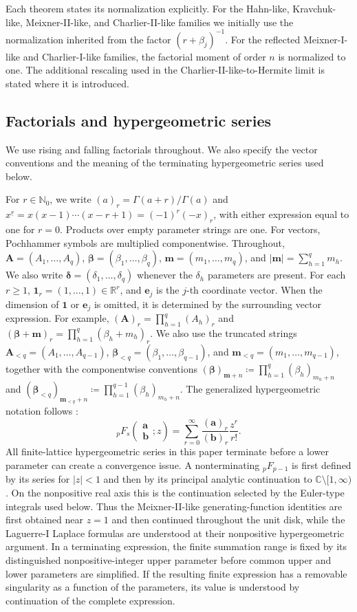 \documentclass[10pt]{amsart}
\newcommand{\Nzero}{\mathbb N_0}
\newcommand{\one}{\boldsymbol 1}
\newcommand{\A}{\boldsymbol A}
\newcommand{\bbeta}{\boldsymbol\beta}
\newcommand{\mm}{\boldsymbol m}
\newcommand{\ee}{\boldsymbol e}
\newcommand{\abs}[1]{\lvert#1\rvert}
\newcommand{\fall}[2]{#1^{\underline{#2}}}
\newcommand{\pFq}[5]{{}_{#1}F_{#2}\!\left(\begin{matrix}#3\\#4\end{matrix};#5\right)}
\theoremstyle{plain}
\theoremstyle{definition}
\theoremstyle{remark}
\begin{document}
Each theorem states its normalization explicitly. For the Hahn-like,
Kravchuk-like, Meixner-II-like, and Charlier-II-like families
we initially use the normalization inherited from the factor
\((r+\beta_j)^{-1}\). For the reflected Meixner-I-like and
Charlier-I-like families, the factorial moment of order \(n\) is
normalized to one. The additional rescaling used in the
Charlier-II-like-to-Hermite limit is stated where it is introduced.


\subsection{Factorials and hypergeometric series}

We use rising and falling factorials throughout. We also specify the vector
conventions and the meaning of the terminating hypergeometric series used
below.

For \(r\in\Nzero\), we write \((a)_r=\Gamma(a+r)/\Gamma(a)\) and
\(\fall{x}{r}=x(x-1)\cdots(x-r+1)=(-1)^r(-x)_r\),
with either expression equal to one for \(r=0\). Products over empty
parameter strings are one. For vectors, Pochhammer symbols are multiplied
componentwise. Throughout, \(\A=(A_1,\ldots,A_q)\),
\(\bbeta=(\beta_1,\ldots,\beta_q)\), \(\mm=(m_1,\ldots,m_q)\), and
\(\abs{\mm}=\sum_{h=1}^qm_h\).
We also write
\(\boldsymbol\delta=(\delta_1,\ldots,\delta_q)\) whenever the
\(\delta_h\) parameters are present.
For each \(r\ge1\), \(\one_r=(1,\ldots,1)\in\mathbb R^r\), and
\(\ee_j\) is the \(j\)-th coordinate vector.  When the dimension of
\(\one\) or \(\ee_j\) is omitted, it is determined by the surrounding
vector expression. For example, \((\A)_r=\prod_{h=1}^q(A_h)_r\) and
\((\bbeta+\mm)_r=\prod_{h=1}^q(\beta_h+m_h)_r\). We also use the
truncated strings \(\A_{<q}=(A_1,\ldots,A_{q-1})\),
\(\bbeta_{<q}=(\beta_1,\ldots,\beta_{q-1})\), and
\(\mm_{<q}=(m_1,\ldots,m_{q-1})\), together with the componentwise
conventions
\((\bbeta)_{\mm+n}\coloneq\prod_{h=1}^q(\beta_h)_{m_h+n}\) and
\((\bbeta_{<q})_{\mm_{<q}+n}
\coloneq\prod_{h=1}^{q-1}(\beta_h)_{m_h+n}\).
The generalized hypergeometric notation follows \cite{DLMF}:
\[
 \pFq{p}{s}{\boldsymbol a}{\boldsymbol b}{z}
 =\sum_{r=0}^{\infty}
 \frac{(\boldsymbol a)_r}{(\boldsymbol b)_r}
 \frac{z^r}{r!}.
\]
All finite-lattice hypergeometric series in this paper terminate before a
lower parameter can create a convergence issue. A nonterminating
\({}_pF_{p-1}\) is first defined by its series for \(\abs z<1\) and then
by its principal analytic continuation to
\(\mathbb C\setminus[1,\infty)\). On the nonpositive real axis this is the
continuation selected by the Euler-type integrals used below. Thus the
Meixner-II-like generating-function identities are first
obtained near \(z=1\) and then continued throughout the unit disk, while
the Laguerre-I Laplace formulas are understood at their nonpositive
hypergeometric argument. In a terminating expression, the finite summation
range is fixed by its distinguished nonpositive-integer upper parameter
before common upper and lower parameters are simplified. If the resulting
finite expression has a removable singularity as a function of the
parameters, its value is understood by continuation of the complete
expression.
\end{document}
